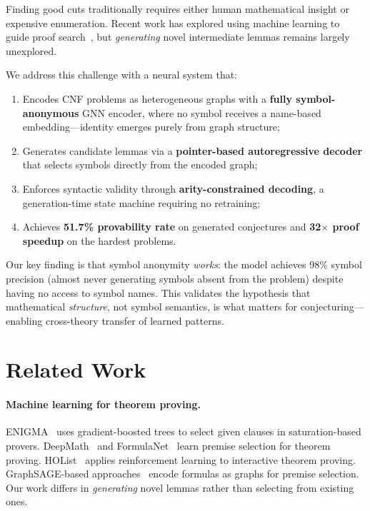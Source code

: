 \documentclass{article}
\begin{document}
Finding good cuts traditionally requires either human mathematical insight or
expensive enumeration. Recent work has explored using machine learning to guide
proof search~\cite{jakubuv2017enigma,loos2017deep,bansal2019holist}, but
\emph{generating} novel intermediate lemmas remains largely unexplored.

We address this challenge with a neural system that:
\begin{enumerate}
\item Encodes CNF problems as heterogeneous graphs with a \textbf{fully
      symbol-anonymous} GNN encoder, where no symbol receives a name-based
      embedding---identity emerges purely from graph structure;
\item Generates candidate lemmas via a \textbf{pointer-based autoregressive
      decoder} that selects symbols directly from the encoded graph;
\item Enforces syntactic validity through \textbf{arity-constrained decoding},
      a generation-time state machine requiring no retraining;
\item Achieves \textbf{51.7\% provability rate} on generated conjectures and
      \textbf{32$\times$ proof speedup} on the hardest problems.
\end{enumerate}

Our key finding is that symbol anonymity \emph{works}: the model achieves 98\%
symbol precision (almost never generating symbols absent from the problem) despite
having no access to symbol names. This validates the hypothesis that mathematical
\emph{structure}, not symbol semantics, is what matters for conjecturing---enabling
cross-theory transfer of learned patterns.

\section{Related Work}
\label{sec:related}

\paragraph{Machine learning for theorem proving.}
ENIGMA~\cite{jakubuv2017enigma} uses gradient-boosted trees to select given
clauses in saturation-based provers. DeepMath~\cite{alemi2016deepmath} and
FormulaNet~\cite{wang2017formulanet} learn premise selection for theorem proving.
HOList~\cite{bansal2019holist} applies reinforcement learning to interactive
theorem proving. GraphSAGE-based approaches~\cite{paliwal2020graph} encode
formulas as graphs for premise selection. Our work differs in \emph{generating}
novel lemmas rather than selecting from existing ones.
\end{document}
